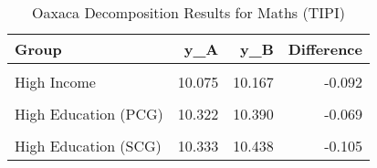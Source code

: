 \begin{table}[!h]

\caption{Oaxaca Decomposition Results for Maths (TIPI)}
\centering
\begin{tabular}[t]{lrrr}
\toprule
Group & y\_A & y\_B & Difference\\
\midrule
\cellcolor{gray!6}{Low Income} & \cellcolor{gray!6}{9.235} & \cellcolor{gray!6}{9.348} & \cellcolor{gray!6}{-0.113}\\
High Income & 10.075 & 10.167 & -0.092\\
\cellcolor{gray!6}{Low Education (PCG)} & \cellcolor{gray!6}{9.371} & \cellcolor{gray!6}{9.454} & \cellcolor{gray!6}{-0.083}\\
High Education (PCG) & 10.322 & 10.390 & -0.069\\
\cellcolor{gray!6}{Low Education (SCG)} & \cellcolor{gray!6}{9.389} & \cellcolor{gray!6}{9.444} & \cellcolor{gray!6}{-0.056}\\
\addlinespace
High Education (SCG) & 10.333 & 10.438 & -0.105\\
\bottomrule
\end{tabular}
\end{table}
